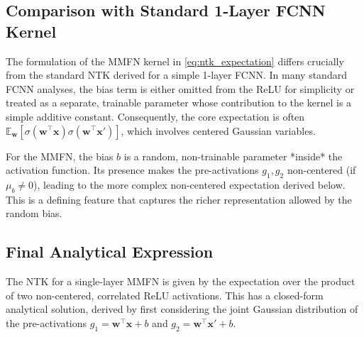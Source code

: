 \documentclass{article}
\begin{document}
\subsection{Comparison with Standard 1-Layer FCNN Kernel}
The formulation of the MMFN kernel in \eqref{eq:ntk_expectation} differs crucially from the standard NTK derived for a simple 1-layer FCNN. In many standard FCNN analyses, the bias term is either omitted from the ReLU for simplicity or treated as a separate, trainable parameter whose contribution to the kernel is a simple additive constant. Consequently, the core expectation is often $\mathbb{E}_{\bm{w}}[\sigma(\bm{w}^\top\bm{x})\sigma(\bm{w}^\top\bm{x}')]$, which involves centered Gaussian variables.

For the MMFN, the bias $b$ is a random, non-trainable parameter *inside* the activation function. Its presence makes the pre-activations $g_1, g_2$ non-centered (if $\mu_b \neq 0$), leading to the more complex non-centered expectation derived below. This is a defining feature that captures the richer representation allowed by the random bias.

\subsection{Final Analytical Expression}
The NTK for a single-layer MMFN is given by the expectation over the product of two non-centered, correlated ReLU activations. This has a closed-form analytical solution, derived by first considering the joint Gaussian distribution of the pre-activations $g_1 = \bm{w}^\top \bm{x} + b$ and $g_2 = \bm{w}^\top \bm{x}' + b$.
\end{document}
